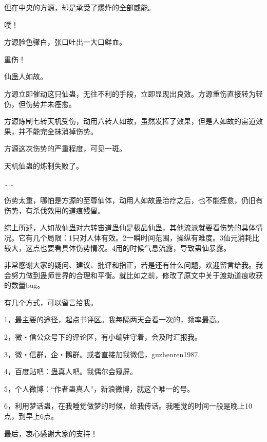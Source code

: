 \begin{this_body}
但在中央的方源，却是承受了爆炸的全部威能。

噗！

方源脸色骤白，张口吐出一大口鲜血。

重伤！

仙蛊人如故。

方源立即催动这只仙蛊，无往不利的手段，立即显现出良效。方源重伤直接转为轻伤，但伤势并未痊愈。

方源炼制七转天机受伤，动用六转人如故，虽然发挥了效果，但是人如故的宙道效果，并不能完全抹消掉伤势。

方源这次伤势的严重程度，可见一斑。

天机仙蛊的炼制失败了。

……

伤势太重，哪怕是方源的至尊仙体，动用人如故蛊治疗之后，也不能痊愈，仍旧有伤势，有杀伐效用的道痕残留。

综上所述，人如故仙蛊对六转宙道蛊仙是极品仙蛊，其他流派就要看伤势的具体情况。它有几个局限：1只对人体有效。2一瞬时间范围，操纵有难度。3仙元消耗比较大，这点也要看具体伤势情况。4用的时候气息流露，导致蛊仙暴露。

非常感谢大家的疑问、建议、批评和指正，若是还有什么问题，欢迎留言给我。我会努力做到蛊师世界的合理和平衡。就比如之前，修改了原文中关于渡劫道痕收获的数量bug。

有几个方式，可以留言给我。

1，最主要的途径，起点书评区。我每隔两天会看一次的，频率最高。

2，微・信公众号下的评论区，有小编驻守着，会及时汇报我。

3，微・信群，企・鹅群。或者直接加我微信，guzhenren1987.

4，百度贴吧：蛊真人吧。我偶尔会窥屏。

5，个人微博：“作者蛊真人”，新浪微博，就这个唯一的号。

6，利用梦话蛊，在我睡觉做梦的时候，给我传话。我睡觉的时间一般是晚上10点，到早上6点。

最后，衷心感谢大家的支持！

\end{this_body}

